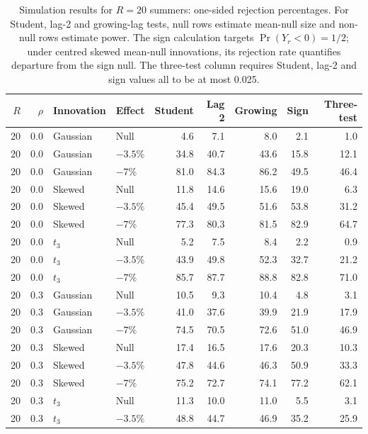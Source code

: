 \scriptsize
\setlength{\tabcolsep}{4.5pt}
\begin{table}[H]
\centering
\normalsize\renewcommand{\arraystretch}{1.55}\setlength{\tabcolsep}{4pt}
\caption{Simulation results for $R=20$ summers: one-sided rejection percentages. For Student, lag-2 and growing-lag tests, null rows estimate mean-null size and non-null rows estimate power. The sign calculation targets $\Pr(Y_r<0)=1/2$; under centred skewed mean-null innovations, its rejection rate quantifies departure from the sign null. The three-test column requires Student, lag-2 and sign values all to be at most 0.025.}
\label{tab:year-simulation-complete-c}
\begin{tabular*}{\textwidth}{@{\extracolsep{\fill}}rrllrrrrr}
\toprule
$R$ & $\rho$ & Innovation & Effect & Student & Lag 2 & Growing & Sign & Three-test \\
\midrule
20 & 0.0 & Gaussian & Null & 4.6 & 7.1 & 8.0 & 2.1 & 1.0 \\
20 & 0.0 & Gaussian & $-3.5\%$ & 34.8 & 40.7 & 43.6 & 15.8 & 12.1 \\
20 & 0.0 & Gaussian & $-7\%$ & 81.0 & 84.3 & 86.2 & 49.5 & 46.4 \\
20 & 0.0 & Skewed & Null & 11.8 & 14.6 & 15.6 & 19.0 & 6.3 \\
20 & 0.0 & Skewed & $-3.5\%$ & 45.4 & 49.5 & 51.6 & 53.8 & 31.2 \\
20 & 0.0 & Skewed & $-7\%$ & 77.3 & 80.3 & 81.5 & 82.9 & 64.7 \\
20 & 0.0 & $t_3$ & Null & 5.2 & 7.5 & 8.4 & 2.2 & 0.9 \\
20 & 0.0 & $t_3$ & $-3.5\%$ & 43.9 & 49.8 & 52.3 & 32.7 & 21.2 \\
20 & 0.0 & $t_3$ & $-7\%$ & 85.7 & 87.7 & 88.8 & 82.8 & 71.0 \\
20 & 0.3 & Gaussian & Null & 10.5 & 9.3 & 10.4 & 4.8 & 3.1 \\
20 & 0.3 & Gaussian & $-3.5\%$ & 41.0 & 37.6 & 39.9 & 21.9 & 17.9 \\
20 & 0.3 & Gaussian & $-7\%$ & 74.5 & 70.5 & 72.6 & 51.0 & 46.9 \\
20 & 0.3 & Skewed & Null & 17.4 & 16.5 & 17.6 & 20.3 & 10.3 \\
20 & 0.3 & Skewed & $-3.5\%$ & 47.8 & 44.6 & 46.3 & 50.9 & 33.3 \\
20 & 0.3 & Skewed & $-7\%$ & 75.2 & 72.7 & 74.1 & 77.2 & 62.1 \\
20 & 0.3 & $t_3$ & Null & 11.3 & 10.0 & 11.0 & 5.5 & 3.1 \\
20 & 0.3 & $t_3$ & $-3.5\%$ & 48.8 & 44.7 & 46.9 & 35.2 & 25.9 \\

\end{tabular*}
\end{table}
